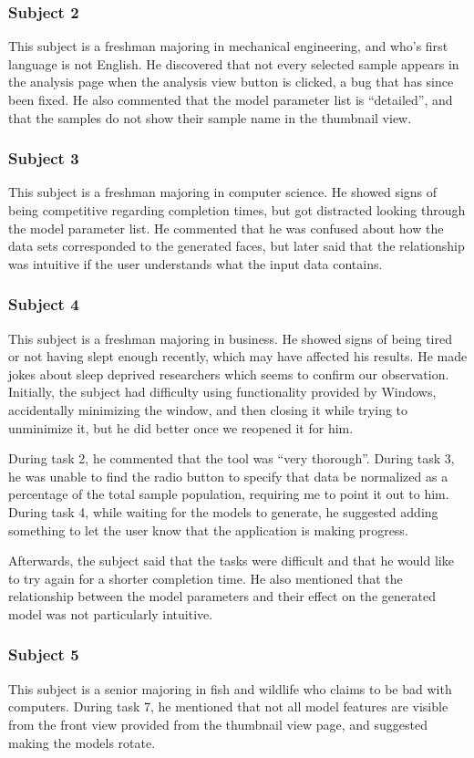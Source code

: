 \documentclass[letterpaper,10pt, onecolumn, draftclsnofoot]{IEEEtran}
\begin{document}
\subsubsection{Subject 2}
This subject is a freshman majoring in mechanical engineering, and who's first language is not English. He discovered that not every selected sample appears in the analysis page when the analysis view button is clicked, a bug that has since been fixed. He also commented that the model parameter list is ``detailed'', and that the samples do not show their sample name in the thumbnail view.

\subsubsection{Subject 3}
This subject is a freshman majoring in computer science. He showed signs of being competitive regarding completion times, but got distracted looking through the model parameter list. He commented that he was confused about how the data sets corresponded to the generated faces, but later said that the relationship was intuitive if the user understands what the input data contains.

\subsubsection{Subject 4}
This subject is a freshman majoring in business. He showed signs of being tired or not having slept enough recently, which may have affected his results. He made jokes about sleep deprived researchers which seems to confirm our observation. Initially, the subject had difficulty using functionality provided by Windows, accidentally minimizing the window, and then closing it while trying to unminimize it, but he did better once we reopened it for him. 

During task 2, he commented that the tool was ``very thorough''. During task 3, he was unable to find the radio button to specify that data be normalized as a percentage of the total sample population, requiring me to point it out to him. During task 4, while waiting for the models to generate, he suggested adding something to let the user know that the application is making progress.

Afterwards, the subject said that the tasks were difficult and that he would like to try again for a shorter completion time. He also mentioned that the relationship between the model parameters and their effect on the generated model was not particularly intuitive.

\subsubsection{Subject 5}
This subject is a senior majoring in fish and wildlife who claims to be bad with computers. During task 7, he mentioned that not all model features are visible from the front view provided from the thumbnail view page, and suggested making the models rotate.
\end{document}
